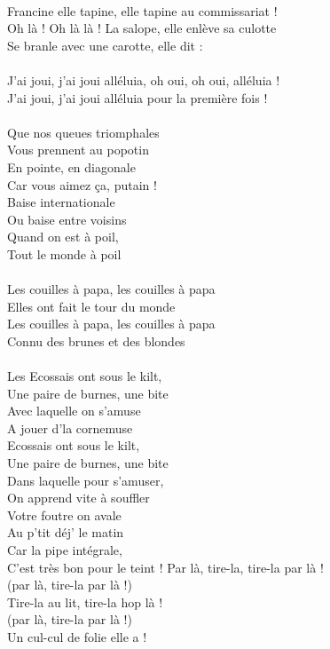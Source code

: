 \\Francine elle tapine, elle tapine au commissariat !
\\Oh là ! Oh là là ! La salope, elle enlève sa culotte
\\Se branle avec une carotte, elle dit :
\\\\J'ai joui, j'ai joui alléluia, oh oui, oh oui, alléluia !
\\J'ai joui, j'ai joui alléluia pour la première fois !
\\\\Que nos queues triomphales
\\Vous prennent au popotin
\\En pointe, en diagonale
\\Car vous aimez ça, putain !
\\Baise internationale
\\Ou baise entre voisins
\\Quand on est à poil,
\\Tout le monde à poil
\\\\Les couilles à papa, les couilles à papa
\\Elles ont fait le tour du monde
\\Les couilles à papa, les couilles à papa
\\Connu des brunes et des blondes
\\\\Les Ecossais ont sous le kilt,
\\Une paire de burnes, une bite
\\Avec laquelle on s'amuse
\\A jouer d'la cornemuse
\\Ecossais ont sous le kilt,
\\Une paire de burnes, une bite
\\Dans laquelle pour s'amuser,
\\On apprend vite à souffler
\\Votre foutre on avale
\\Au p'tit déj' le matin
\\Car la pipe intégrale,
\\C'est très bon pour le teint !
\breakpage
Par là, tire-la, tire-la par là !
\\(par là, tire-la par là !)
\\Tire-la au lit, tire-la hop là !
\\(par là, tire-la par là !)
\\Un cul-cul de folie elle a !
